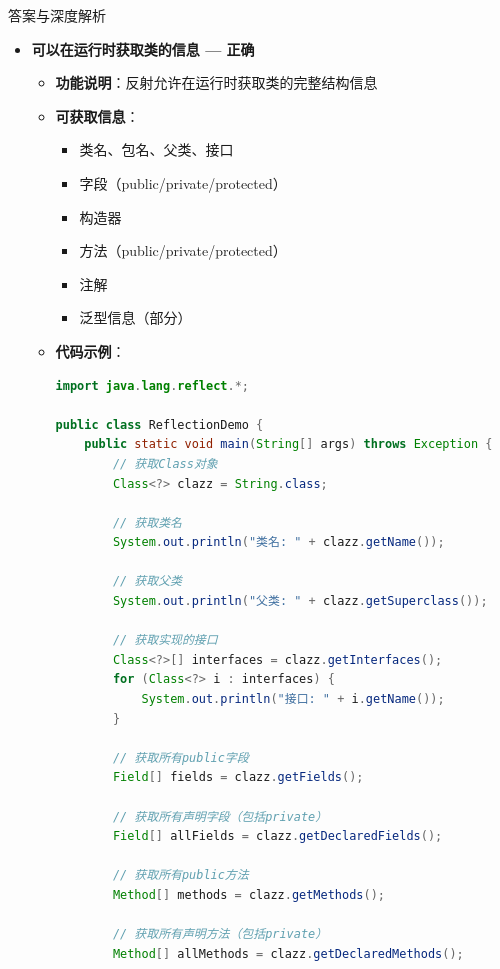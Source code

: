 \documentclass[12pt, a4paper]{ctexart}
\begin{document}
\begin{enumerate}[label=\textbf{\arabic*.}]
\begin{bluebox}{答案与深度解析}
		      \begin{itemize}[leftmargin=*, nosep, label={}]
			      \item[A] \textbf{可以在运行时获取类的信息 — 正确}
			            \begin{itemize}[label={}, leftmargin=*, nosep]
				            \item \textbf{功能说明}：反射允许在运行时获取类的完整结构信息
				            \item \textbf{可获取信息}：
				                  \begin{itemize}[label={}, nosep]
					                  \item 类名、包名、父类、接口
					                  \item 字段（public/private/protected）
					                  \item 构造器
					                  \item 方法（public/private/protected）
					                  \item 注解
					                  \item 泛型信息（部分）
				                  \end{itemize}
				            \item \textbf{代码示例}：
				                  \begin{lstlisting}[language=Java]
import java.lang.reflect.*;

public class ReflectionDemo {
    public static void main(String[] args) throws Exception {
        // 获取Class对象
        Class<?> clazz = String.class;

        // 获取类名
        System.out.println("类名: " + clazz.getName());

        // 获取父类
        System.out.println("父类: " + clazz.getSuperclass());

        // 获取实现的接口
        Class<?>[] interfaces = clazz.getInterfaces();
        for (Class<?> i : interfaces) {
            System.out.println("接口: " + i.getName());
        }

        // 获取所有public字段
        Field[] fields = clazz.getFields();

        // 获取所有声明字段（包括private）
        Field[] allFields = clazz.getDeclaredFields();

        // 获取所有public方法
        Method[] methods = clazz.getMethods();

        // 获取所有声明方法（包括private）
        Method[] allMethods = clazz.getDeclaredMethods();


\end{lstlisting}
\end{itemize}
\end{itemize}
\end{bluebox}
\end{enumerate}
\end{document}

